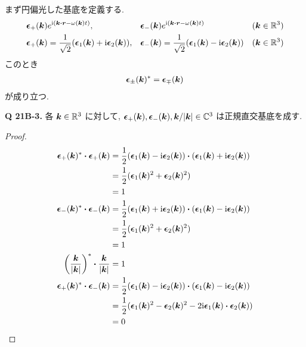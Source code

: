 \documentclass[a4paper,dvipdfmx]{jsarticle}
\theoremstyle{definition}
\begin{document}
まず円偏光した基底を定義する.
\begin{align}
  \ee_+(\kk) & e^{\ii(\kk\vdot\rr - \omega(\kk)t)},              & \ee_-(\kk) & e^{\ii(\kk\vdot\rr - \omega(\kk)t)}              & (\kk\in\RR^3) \\
  \ee_+(\kk) & = \frac{1}{\sqrt{2}}(\ee_1(\kk) + \ii\ee_2(\kk)), & \ee_-(\kk) & = \frac{1}{\sqrt{2}}(\ee_1(\kk) - \ii\ee_2(\kk)) & (\kk\in\RR^3)
\end{align}
このとき
\begin{align}
  \vb*{\epsilon}_\pm(\vb*{k})^* = \vb*{\epsilon}_\mp(\vb*{k})
\end{align}
が成り立つ.

\textbf{Q 21B-3.} 各 $\vb*{k}\in\mathbb{R}^3$ に対して, $\vb*{\epsilon}_+(\vb*{k}), \vb*{\epsilon}_-(\vb*{k}), \vb*{k}/|\vb*{k}|\in\mathbb{C}^3$ は正規直交基底を成す.
\begin{proof}
  \begin{align}
    \ee_+(\kk)^*\vdot\ee_+(\kk)                            & = \frac{1}{2}(\ee_1(\kk) - \ii\ee_2(\kk))\vdot(\ee_1(\kk) + \ii\ee_2(\kk)) \\
                                                           & = \frac{1}{2}(\ee_1(\kk)^2 + \ee_2(\kk)^2)                                 \\
                                                           & = 1                                                                        \\
    \ee_-(\kk)^*\vdot\ee_-(\kk)                            & = \frac{1}{2}(\ee_1(\kk) + \ii\ee_2(\kk))\vdot(\ee_1(\kk) - \ii\ee_2(\kk)) \\
                                                           & = \frac{1}{2}(\ee_1(\kk)^2 + \ee_2(\kk)^2)                                 \\
                                                           & = 1                                                                        \\
    \left(\frac{\kk}{|\kk|}\right)^*\vdot\frac{\kk}{|\kk|} & = 1                                                                        \\
    \ee_+(\kk)^*\vdot\ee_-(\kk)                            & = \frac{1}{2}(\ee_1(\kk) - \ii\ee_2(\kk))\vdot(\ee_1(\kk) - \ii\ee_2(\kk)) \\
                                                           & = \frac{1}{2}(\ee_1(\kk)^2 - \ee_2(\kk)^2 - 2\ii\ee_1(\kk)\vdot\ee_2(\kk)) \\
                                                           & = 0                                                                        \\

\end{align}
\end{proof}
\end{document}
